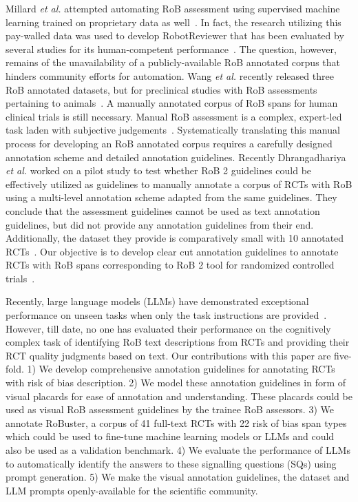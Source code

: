 \documentclass[sn-mathphys,Numbered]{sn-jnl}%
\theoremstyle{thmstyleone}%
\theoremstyle{thmstyletwo}%
\theoremstyle{thmstylethree}%
\begin{document}
Millard \textit{et al.} attempted automating RoB assessment using supervised machine learning trained on proprietary data as well~\cite{millard2016machine}.
In fact, the research utilizing this pay-walled data was used to develop RobotReviewer that has been evaluated by several studies for its human-competent performance~\cite{marshall2016robotreviewer,soboczenski2019machine,vinkers2021methodological,jardim2022automating,hirt2021agreement}.
The question, however, remains of the unavailability of a publicly-available RoB annotated corpus that hinders community efforts for automation. 
Wang \textit{et al.} recently released three RoB annotated datasets, but for preclinical studies with RoB assessments pertaining to animals~\cite{wang2022risk}.
A manually annotated corpus of RoB spans for human clinical trials is still necessary.
Manual RoB assessment is a complex, expert-led task laden with subjective judgements~\cite{minozzi2022reliability,hartling2009risk}.
Systematically translating this manual process for developing an RoB annotated corpus requires a carefully designed annotation scheme and detailed annotation guidelines.
Recently Dhrangadhariya \textit{et al.} worked on a pilot study to test whether RoB 2 guidelines could be effectively utilized as guidelines to manually annotate a corpus of RCTs with RoB using a multi-level annotation scheme adapted from the same guidelines.
They conclude that the assessment guidelines cannot be used as text annotation guidelines, but did not provide any annotation guidelines from their end.
Additionally, the dataset they provide is comparatively small with 10 annotated RCTs~\cite{dhrangadhariya2023first}.
Our objective is to develop clear cut annotation guidelines to annotate RCTs with RoB spans corresponding to RoB 2 tool for randomized controlled trials~\cite{sterne2019rob}.



Recently, large language models (LLMs) have demonstrated exceptional performance on unseen tasks when only the task instructions are provided~\cite{chang2023survey}.
However, till date, no one has evaluated their performance on the cognitively complex task of identifying RoB text descriptions from RCTs and providing their RCT quality judgments based on text.
Our contributions with this paper are five-fold. 
1) We develop comprehensive annotation guidelines for annotating RCTs with risk of bias description.
2) We model these annotation guidelines in form of visual placards for ease of annotation and understanding. These placards could be used as visual RoB assessment guidelines by the trainee RoB assessors.
3) We annotate RoBuster, a corpus of 41 full-text RCTs with 22 risk of bias span types which could be used to fine-tune machine learning models or LLMs and could also be used as a validation benchmark.
4) We evaluate the performance of LLMs to automatically identify the answers to these signalling questions (SQs) using prompt generation.
5) We make the visual annotation guidelines, the dataset and LLM prompts openly-available for the scientific community.
%
%
%
\end{document}
